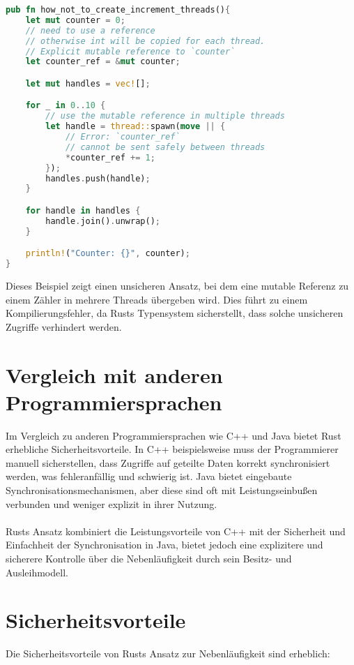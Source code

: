 \begin{lstlisting}[language=Rust, caption=Unsicheres Erstellen von Threads in Rust]
pub fn how_not_to_create_increment_threads(){
    let mut counter = 0;
    // need to use a reference 
    // otherwise int will be copied for each thread.
    // Explicit mutable reference to `counter`
    let counter_ref = &mut counter; 

    let mut handles = vec![];

    for _ in 0..10 {
        // use the mutable reference in multiple threads
        let handle = thread::spawn(move || {
            // Error: `counter_ref` 
            // cannot be sent safely between threads
            *counter_ref += 1; 
        });
        handles.push(handle);
    }

    for handle in handles {
        handle.join().unwrap();
    }

    println!("Counter: {}", counter);
}
\end{lstlisting}
\noindent
Dieses Beispiel zeigt einen unsicheren Ansatz, bei dem eine mutable Referenz zu einem Zähler in mehrere Threads übergeben wird. 
Dies führt zu einem Kompilierungsfehler, da Rusts Typensystem sicherstellt, dass solche unsicheren Zugriffe verhindert werden.

\section{Vergleich mit anderen Programmiersprachen}

Im Vergleich zu anderen Programmiersprachen wie C++ und Java bietet Rust erhebliche Sicherheitsvorteile. 
In C++ beispielsweise muss der Programmierer manuell sicherstellen, dass Zugriffe auf geteilte Daten korrekt synchronisiert werden, was fehleranfällig und schwierig ist. 
Java bietet eingebaute Synchronisationsmechanismen, aber diese sind oft mit Leistungseinbußen verbunden und weniger explizit in ihrer Nutzung.\\
\\
Rusts Ansatz kombiniert die Leistungsvorteile von C++ mit der Sicherheit und Einfachheit der Synchronisation in Java, bietet jedoch eine explizitere und sicherere Kontrolle über die Nebenläufigkeit durch sein Besitz- und Ausleihmodell.

\section{Sicherheitsvorteile}

Die Sicherheitsvorteile von Rusts Ansatz zur Nebenläufigkeit sind erheblich:


